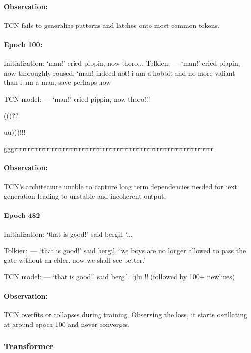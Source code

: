 \documentclass[11pt]{article}
\numberwithin{equation}{section}
\begin{document}
\paragraph{Observation:} TCN fails to generalize patterns and latches onto most common tokens.

\paragraph{Epoch 100:}

Initialization: ‘man!’ cried pippin, now thoro... Tolkien: --- ‘man!’ cried
pippin, now thoroughly roused. ‘man! indeed not! i am a hobbit and no more valiant
than i am a man, save perhaps now

TCN model: --- ‘man!’ cried pippin, now thoro!!!

(((??

uu)))!!!

gggrrrrrrrrrrrrrrrrrrrrrrrrrrrrrrrrrrrrrrrrrrrrrrrrrrrrrrrrrrrrrrrrrrrrrrrrrr

\paragraph{Observation:} TCN's architecture unable to capture long term dependencies needed
for text generation leading to unstable and incoherent output.

\paragraph{Epoch 482}

Initialization: ‘that is good!’ said bergil. ‘...

Tolkien: --- ‘that is good!’ said bergil. ‘we boys are no longer allowed to pass
the gate without an elder. now we shall see better.’

TCN model: --- ‘that is good!’ said bergil. ‘j!u !! (followed by 100+ newlines)

\paragraph{Observation:} TCN overfits or collapses during training. Observing the loss, it
starts oscillating at around epoch 100 and never converges.

\subsubsection{Transformer}
\end{document}
